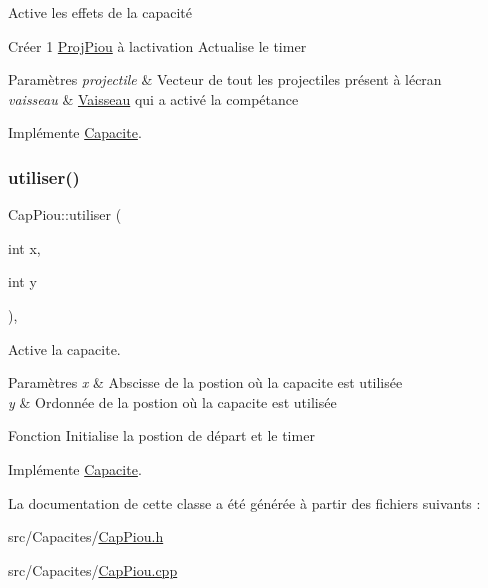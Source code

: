 Active les effets de la capacité 

Créer 1 \hyperlink{class_proj_piou}{Proj\+Piou} à l\textquotesingle{}activation Actualise le timer 
\begin{DoxyParams}{Paramètres}
{\em projectile} & Vecteur de tout les projectiles présent à l\textquotesingle{}écran \\
\hline
{\em vaisseau} & \hyperlink{class_vaisseau}{Vaisseau} qui a activé la compétance \\
\hline
\end{DoxyParams}


Implémente \hyperlink{class_capacite_a75c9621d7a704fedb10ad29c6a697d64}{Capacite}.

\mbox{\label{class_cap_piou_aad0eb3b9fab67785e1d0441b96aa921f}} 
\subsubsection{\texorpdfstring{utiliser()}{utiliser()}}
{\footnotesize\ttfamily Cap\+Piou\+::utiliser (\begin{DoxyParamCaption}\item[{int}]{x,  }\item[{int}]{y }\end{DoxyParamCaption})\hspace{0.3cm}{\ttfamily [override]}, {\ttfamily [virtual]}}



Active la capacite. 


\begin{DoxyParams}{Paramètres}
{\em x} & Abscisse de la postion où la capacite est utilisée \\
\hline
{\em y} & Ordonnée de la postion où la capacite est utilisée\\
\hline
\end{DoxyParams}
Fonction Initialise la postion de départ et le timer 

Implémente \hyperlink{class_capacite_a6f5e6efda11f80ab8538e23f5bdc6e79}{Capacite}.



La documentation de cette classe a été générée à partir des fichiers suivants \+:\begin{DoxyCompactItemize}
\item 
src/\+Capacites/\hyperlink{_cap_piou_8h}{Cap\+Piou.\+h}\item 
src/\+Capacites/\hyperlink{_cap_piou_8cpp}{Cap\+Piou.\+cpp}\end{DoxyCompactItemize}

